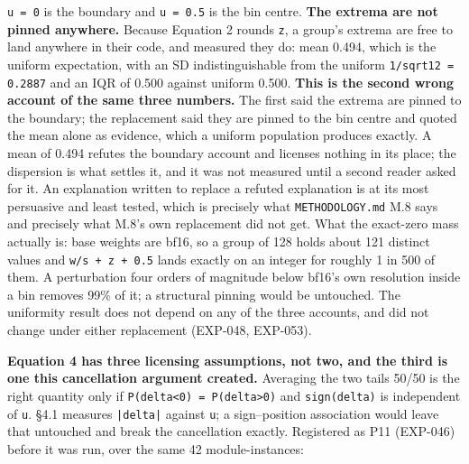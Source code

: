 \texttt{u = 0} is the boundary and \texttt{u = 0.\allowbreak{}5} is the bin centre. \textbf{The extrema are not pinned anywhere.} Because Equation 2 rounds \texttt{z}, a group's extrema are free to land anywhere in their code, and measured they do: mean 0.494, which is the uniform expectation, with an SD indistinguishable from the uniform \texttt{1/\allowbreak{}sqrt12 = 0.\allowbreak{}2887} and an IQR of 0.500 against uniform 0.500. \textbf{This is the second wrong account of the same three numbers.} The first said the extrema are pinned to the boundary; the replacement said they are pinned to the bin centre and quoted the mean alone as evidence, which a uniform population produces exactly. A mean of 0.494 refutes the boundary account and licenses nothing in its place; the dispersion is what settles it, and it was not measured until a second reader asked for it. An explanation written to replace a refuted explanation is at its most persuasive and least tested, which is precisely what \texttt{METHODOLOGY.\allowbreak{}md} M.8 says and precisely what M.8's own replacement did not get. What the exact-zero mass actually is: base weights are bf16, so a group of 128 holds about 121 distinct values and \texttt{w/\allowbreak{}s + z + 0.\allowbreak{}5} lands exactly on an integer for roughly 1 in 500 of them. A perturbation four orders of magnitude below bf16's own resolution inside a bin removes 99\% of it; a structural pinning would be untouched. The uniformity result does not depend on any of the three accounts, and did not change under either replacement (EXP-048, EXP-053).

\textbf{Equation 4 has three licensing assumptions, not two, and the third is one this cancellation argument created.} Averaging the two tails 50/50 is the right quantity only if \texttt{P(delta<0) = P(delta>0)} and \texttt{sign(delta)} is independent of \texttt{u}. \S{}4.1 measures \texttt{|delta|} against \texttt{u}; a sign--position association would leave that untouched and break the cancellation exactly. Registered as P11 (EXP-046) before it was run, over the same 42 module-instances:

